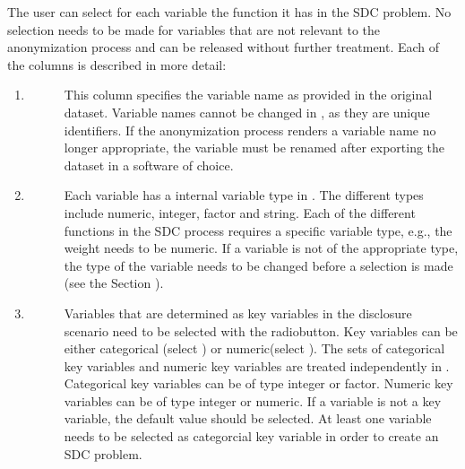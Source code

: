 \documentclass[letterpaper,10pt,english]{sphinxmanual}
\begin{document}
The user can select for each
variable the function it has in the SDC problem. No selection needs to
be made for variables that are not relevant to the
anonymization process and can be released without further treatment. Each of the
columns is described in more detail:
\begin{enumerate}
\item {} \begin{description}
\item[{}] \leavevmode
This column specifies the variable name as provided in the original dataset.
Variable names cannot be changed in , as they are unique identifiers. If
the anonymization process renders a variable name no longer appropriate, the variable
must be renamed after exporting the dataset in a software of choice.

\end{description}

\item {} \begin{description}
\item[{}] \leavevmode
Each variable has a internal variable type in . The different types include
numeric, integer, factor and string. Each of the different functions in the
SDC process requires a specific variable type, e.g., the weight needs to be numeric.
If a variable is not of the appropriate type, the type of the variable needs to be changed
before a selection is made (see the Section ).

\end{description}

\item {} \begin{description}
\item[{}] \leavevmode
Variables that are determined as key variables in the disclosure
scenario need to be selected with the radiobutton.
Key variables can be either categorical (select ) or numeric(select ).
The sets of categorical key variables and numeric key variables are treated independently
in . Categorical key variables can be of type integer or factor. Numeric key variables
can be of type integer or numeric. If a variable is not a key variable, the default
value  should be selected.
At least one variable needs to be selected as
categorcial key variable in order to create an SDC problem.


\end{description}
\end{enumerate}
\end{document}
